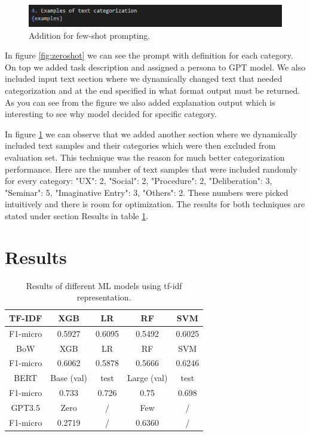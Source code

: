 \documentclass[fleqn,moreauthors,10pt]{ds_report}
\begin{document}
\begin{figure}[ht]\centering
	\includegraphics[width=\linewidth]{report/fig/monkeybusiness.png}
        \caption{Addition for few-shot prompting.}
        \label{fig:fewshot}
\end{figure}

In figure \ref{fig:zeroshot} we can see the prompt with definition for each category. On top we added task description and assigned a persona to GPT model. We also included input text section where we dynamically changed text that needed categorization and at the end specified in what format output must be returned. As you can see from the figure we also added explanation output which is interesting to see why model decided for specific category.

In figure \ref{fig:fewshot} we can observe that we added another section where we dynamically included text samples and their categories which were then excluded from evaluation set. This technique was the reason for much better categorization performance. Here are the number of text samples that were included randomly for every category: "UX": 2, "Social": 2, "Procedure": 2, "Deliberation": 3, "Seminar": 5, "Imaginative Entry": 3, "Others": 2. These numbers were picked intuitively and there is room for optimization. The results for both techniques are stated under section Results in table \ref{tab:results}.


\section*{Results}

\begin{table}[h]
\centering
\caption{Results of different ML models using tf-idf representation.}
\vspace{0.3cm}
\label{tab:results}
\begin{tabular}{|c|c|c|c|c|}
\hline
TF-IDF & XGB & LR & RF & SVM \\
\hline
F1-micro & 0.5927 & 0.6095 & 0.5492 & 0.6025 \\
\hline
BoW & XGB & LR & RF & SVM \\
\hline
F1-micro & 0.6062 & 0.5878 & 0.5666 & 0.6246 \\
\hline
BERT & Base (val) & test & Large (val) & test  \\
\hline
F1-micro & 0.733 & 0.726 & 0.75 & 0.698 \\
\hline
GPT3.5 & Zero & / & Few & / \\
\hline
F1-micro & 0.2719 & / & 0.6360 & / \\
\hline
\end{tabular}
\end{table}
\end{document}
